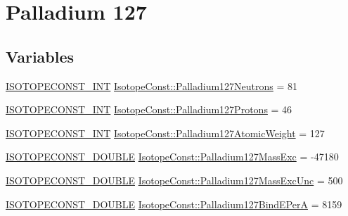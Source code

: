 \hypertarget{group___isotope_const-_palladium-_pd127}{}\section{Palladium 127}
\label{group___isotope_const-_palladium-_pd127}
\subsection*{Variables}
\begin{DoxyCompactItemize}
\item 
\mbox{\hyperlink{group___isotope_const-_macros_ga5f18360b3e99483a35c32d789e62621c}{I\+S\+O\+T\+O\+P\+E\+C\+O\+N\+S\+T\+\_\+\+I\+NT}} \mbox{\hyperlink{group___isotope_const-_palladium-_pd127_gabd77b8ae58b832a49ea779b227557d4d}{Isotope\+Const\+::\+Palladium127\+Neutrons}} = 81
\item 
\mbox{\hyperlink{group___isotope_const-_macros_ga5f18360b3e99483a35c32d789e62621c}{I\+S\+O\+T\+O\+P\+E\+C\+O\+N\+S\+T\+\_\+\+I\+NT}} \mbox{\hyperlink{group___isotope_const-_palladium-_pd127_ga339aacb0fdd3a69bbce677ca2c78234c}{Isotope\+Const\+::\+Palladium127\+Protons}} = 46
\item 
\mbox{\hyperlink{group___isotope_const-_macros_ga5f18360b3e99483a35c32d789e62621c}{I\+S\+O\+T\+O\+P\+E\+C\+O\+N\+S\+T\+\_\+\+I\+NT}} \mbox{\hyperlink{group___isotope_const-_palladium-_pd127_gaf13f7ba702d4bc3ca4c65cfe39effe57}{Isotope\+Const\+::\+Palladium127\+Atomic\+Weight}} = 127
\item 
\mbox{\hyperlink{group___isotope_const-_macros_ga8f45a7272ce02c0b4c65c44636ed719a}{I\+S\+O\+T\+O\+P\+E\+C\+O\+N\+S\+T\+\_\+\+D\+O\+U\+B\+LE}} \mbox{\hyperlink{group___isotope_const-_palladium-_pd127_ga481588eadde33ee309636d2af3c76c0c}{Isotope\+Const\+::\+Palladium127\+Mass\+Exc}} = -\/47180
\item 
\mbox{\hyperlink{group___isotope_const-_macros_ga8f45a7272ce02c0b4c65c44636ed719a}{I\+S\+O\+T\+O\+P\+E\+C\+O\+N\+S\+T\+\_\+\+D\+O\+U\+B\+LE}} \mbox{\hyperlink{group___isotope_const-_palladium-_pd127_ga1de40f174eea39f422109c5c440a6d8d}{Isotope\+Const\+::\+Palladium127\+Mass\+Exc\+Unc}} = 500
\item 
\mbox{\hyperlink{group___isotope_const-_macros_ga8f45a7272ce02c0b4c65c44636ed719a}{I\+S\+O\+T\+O\+P\+E\+C\+O\+N\+S\+T\+\_\+\+D\+O\+U\+B\+LE}} \mbox{\hyperlink{group___isotope_const-_palladium-_pd127_ga897bae2d5040664ab7eb88203c4aafee}{Isotope\+Const\+::\+Palladium127\+Bind\+E\+PerA}} = 8159
\item 

\end{DoxyCompactItemize}
